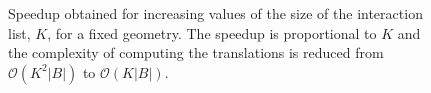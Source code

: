 \begin{figure}
  \caption{Speedup obtained for increasing values of the size of the interaction list, $K$, for a fixed geometry. The speedup is proportional to $K$ and the complexity of computing the translations is reduced from $\mathcal{O}(K^2|B|)$ to $\mathcal{O}(K|B|)$.}  \label{fig:speedup}
\end{figure}  
%

